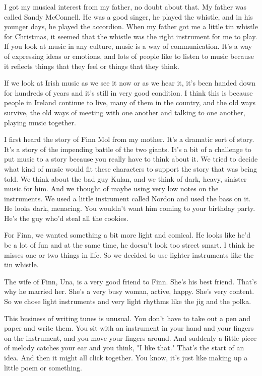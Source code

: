 I got my musical interest from my father, no doubt about that. My father was called Sandy McConnell. He was a good singer, he played the whistle, and in his younger days, he played the accordion. When my father got me a little tin whistle for Christmas, it seemed that the whistle was the right instrument for me to play. If you look at music in any culture, music is a way of communication. It's a way of expressing ideas or emotions, and lots of people like to listen to music because it reflects things that they feel or things that they think.

If we look at Irish music as we see it now or as we hear it, it's been handed down for hundreds of years and it's still in very good condition. I think this is because people in Ireland continue to live, many of them in the country, and the old ways survive, the old ways of meeting with one another and talking to one another, playing music together.

I first heard the story of Finn Mol from my mother. It's a dramatic sort of story. It's a story of the impending battle of the two giants. It's a bit of a challenge to put music to a story because you really have to think about it. We tried to decide what kind of music would fit these characters to support the story that was being told. We think about the bad guy Kulan, and we think of dark, heavy, sinister music for him. And we thought of maybe using very low notes on the instruments. We used a little instrument called Nordon and used the bass on it. He looks dark, menacing. You wouldn't want him coming to your birthday party. He's the guy who'd steal all the cookies.

For Finn, we wanted something a bit more light and comical. He looks like he'd be a lot of fun and at the same time, he doesn't look too street smart. I think he misses one or two things in life. So we decided to use lighter instruments like the tin whistle.

The wife of Finn, Una, is a very good friend to Finn. She's his best friend. That's why he married her. She's a very busy woman, active, happy. She's very content. So we chose light instruments and very light rhythms like the jig and the polka.

This business of writing tunes is unusual. You don't have to take out a pen and paper and write them. You sit with an instrument in your hand and your fingers on the instrument, and you move your fingers around. And suddenly a little piece of melody catches your ear and you think, "I like that." That's the start of an idea. And then it might all click together. You know, it's just like making up a little poem or something.

